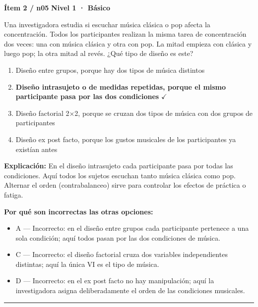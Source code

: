 \documentclass[12pt,a4paper]{article}
\begin{document}
\begin{mdframed}[backgroundcolor=fondogris,linecolor=azul,linewidth=1pt,innerleftmargin=10pt,innerrightmargin=10pt,innertopmargin=7pt,innerbottommargin=7pt]
\textbf{Ítem 2 / n05} \hfill {\small\bfseries\color{azul} Nivel 1 · Básico}
\end{mdframed}

Una investigadora estudia si escuchar música clásica o pop afecta la concentración. Todos los participantes realizan la misma tarea de concentración dos veces: una con música clásica y otra con pop. La mitad empieza con clásica y luego pop; la otra mitad al revés. ¿Qué tipo de diseño es este?

\begin{enumerate}
  \item[A.] Diseño entre grupos, porque hay dos tipos de música distintos
  \item[\textbf{\color{verde}B.}] \textbf{\color{verde} Diseño intrasujeto o de medidas repetidas, porque el mismo participante pasa por las dos condiciones} \hfill $\checkmark$
  \item[C.] Diseño factorial 2×2, porque se cruzan dos tipos de música con dos grupos de participantes
  \item[D.] Diseño ex post facto, porque los gustos musicales de los participantes ya existían antes
\end{enumerate}

\noindent\textbf{\color{azul}Explicación:} En el diseño intrasujeto cada participante pasa por todas las condiciones. Aquí todos los sujetos escuchan tanto música clásica como pop. Alternar el orden (contrabalanceo) sirve para controlar los efectos de práctica o fatiga.

\noindent\textbf{\color{gris}Por qué son incorrectas las otras opciones:}
\begin{itemize}
  \item {\small A — Incorrecto: en el diseño entre grupos cada participante pertenece a una sola condición; aquí todos pasan por las dos condiciones de música.}
  \item {\small C — Incorrecto: el diseño factorial cruza dos variables independientes distintas; aquí la única VI es el tipo de música.}
  \item {\small D — Incorrecto: en el ex post facto no hay manipulación; aquí la investigadora asigna deliberadamente el orden de las condiciones musicales.}
\end{itemize}
\vspace{8pt}\hrule\vspace{10pt}
\end{document}
